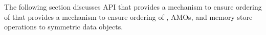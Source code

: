 The following section discusses \openshmem \ac{API} that provides a mechanism to ensure ordering of that provides a mechanism to ensure ordering of , \acp{AMO}, and memory store operations to symmetric data 
objects. 